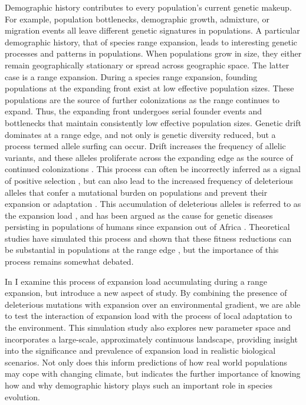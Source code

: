 Demographic history contributes to every population's current genetic makeup. For example, population bottlenecks, demographic growth, admixture, or migration events all leave different genetic signatures in populations. A particular demographic history, that of species range expansion, leads to interesting genetic processes and patterns in populations. When populations grow in size, they either remain geographically stationary or spread across geographic space. The latter case is a range expansion. During a species range expansion, founding populations at the expanding front exist at low effective population sizes. These populations are the source of further colonizations as the range continues to expand. Thus, the expanding front undergoes serial founder events and bottlenecks that maintain consistently low effective population sizes. Genetic drift dominates at a range edge, and not only is genetic diversity reduced, but a process termed allele surfing can occur. Drift increases the frequency of allelic variants, and these alleles proliferate across the expanding edge as the source of continued colonizations \citep{Klopfstein:2006}. This process can often be incorrectly inferred as a signal of positive selection \citep{Edmonds:2004}, but can also lead to the increased frequency of deleterious alleles that confer a mutational burden on populations and prevent their expansion or adaptation \citep{Peischl:2013, Peischl:2015, Excoffier:2009}. This accumulation of deleterious alleles is referred to as the expansion load \citep{Peischl:2013}, and has been argued as the cause for genetic diseases persisting in populations of humans since expansion out of Africa \citep{Henn:2015, Henn:2015b, Lohmueller:2008, Lohmueller:2014b, Do:2015}. Theoretical studies have simulated this process and shown that these fitness reductions can be substantial in populations at the range edge \citep{Peischl:2013, Peischl:2015, Peischl:2015b}, but the importance of this process remains somewhat debated.

In  I examine this process of expansion load accumulating during a range expansion, but introduce a new aspect of study. By combining the presence of deleterious mutations with expansion over an environmental gradient, we are able to test the interaction of expansion load with the process of local adaptation to the environment. This simulation study also explores new parameter space and incorporates a large-scale, approximately continuous landscape, providing insight into the significance and prevalence of expansion load in realistic biological scenarios. Not only does this inform predictions of how real world populations may cope with changing climate, but indicates the further importance of knowing how and why demographic history plays such an important role in species evolution.

